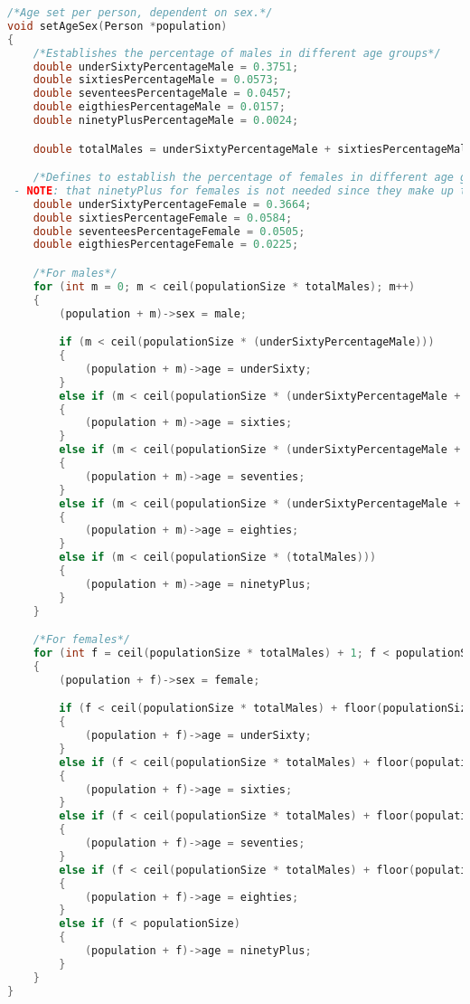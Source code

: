 \begin{lstlisting}[language=c, caption={Our simulations written in c}, captionpos=b, label={snippet:LABELNAVN}]
/*Age set per person, dependent on sex.*/
void setAgeSex(Person *population)
{
    /*Establishes the percentage of males in different age groups*/
    double underSixtyPercentageMale = 0.3751;
    double sixtiesPercentageMale = 0.0573;
    double seventeesPercentageMale = 0.0457;
    double eigthiesPercentageMale = 0.0157;
    double ninetyPlusPercentageMale = 0.0024;

    double totalMales = underSixtyPercentageMale + sixtiesPercentageMale + seventeesPercentageMale + eigthiesPercentageMale + ninetyPlusPercentageMale;

    /*Defines to establish the percentage of females in different age groups
 - NOTE: that ninetyPlus for females is not needed since they make up the remaining part of population*/
    double underSixtyPercentageFemale = 0.3664;
    double sixtiesPercentageFemale = 0.0584;
    double seventeesPercentageFemale = 0.0505;
    double eigthiesPercentageFemale = 0.0225;

    /*For males*/
    for (int m = 0; m < ceil(populationSize * totalMales); m++)
    {
        (population + m)->sex = male;

        if (m < ceil(populationSize * (underSixtyPercentageMale)))
        {
            (population + m)->age = underSixty;
        }
        else if (m < ceil(populationSize * (underSixtyPercentageMale + sixtiesPercentageMale)))
        {
            (population + m)->age = sixties;
        }
        else if (m < ceil(populationSize * (underSixtyPercentageMale + sixtiesPercentageMale + seventeesPercentageMale)))
        {
            (population + m)->age = seventies;
        }
        else if (m < ceil(populationSize * (underSixtyPercentageMale + sixtiesPercentageMale + seventeesPercentageMale + eigthiesPercentageMale)))
        {
            (population + m)->age = eighties;
        }
        else if (m < ceil(populationSize * (totalMales)))
        {
            (population + m)->age = ninetyPlus;
        }
    }

    /*For females*/
    for (int f = ceil(populationSize * totalMales) + 1; f < populationSize; f++)
    {
        (population + f)->sex = female;

        if (f < ceil(populationSize * totalMales) + floor(populationSize * underSixtyPercentageFemale))
        {
            (population + f)->age = underSixty;
        }
        else if (f < ceil(populationSize * totalMales) + floor(populationSize * (underSixtyPercentageFemale + sixtiesPercentageFemale)))
        {
            (population + f)->age = sixties;
        }
        else if (f < ceil(populationSize * totalMales) + floor(populationSize * (underSixtyPercentageFemale + sixtiesPercentageFemale + seventeesPercentageFemale)))
        {
            (population + f)->age = seventies;
        }
        else if (f < ceil(populationSize * totalMales) + floor(populationSize * (underSixtyPercentageFemale + sixtiesPercentageFemale + seventeesPercentageFemale + eigthiesPercentageFemale)))
        {
            (population + f)->age = eighties;
        }
        else if (f < populationSize)
        {
            (population + f)->age = ninetyPlus;
        }
    }
}


\end{lstlisting}
